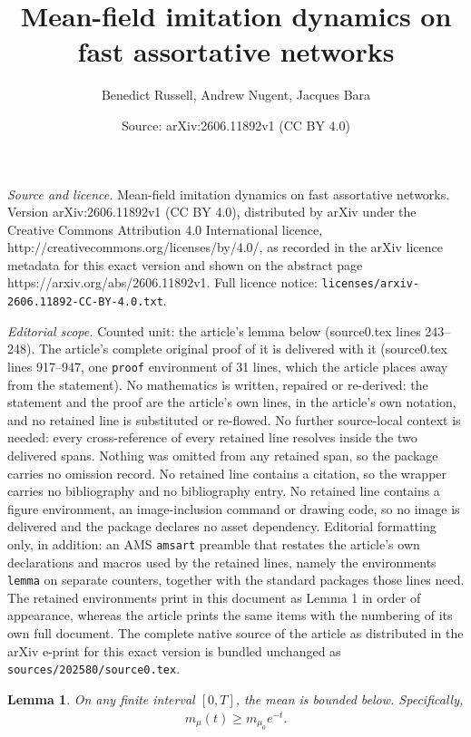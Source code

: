 \documentclass[10pt,a4paper]{amsart}
\title{Mean-field imitation dynamics on fast assortative networks}
\author{Benedict Russell, Andrew Nugent, Jacques Bara}
\date{Source: arXiv:2606.11892v1 (CC BY 4.0)}
\newtheorem{lemma}{Lemma}
\begin{document}
\maketitle

\noindent\emph{Source and licence.} Mean-field imitation dynamics on fast assortative networks. Version arXiv:2606.11892v1 (CC BY 4.0), distributed by arXiv under the Creative Commons Attribution 4.0 International licence, http://creativecommons.org/licenses/by/4.0/, as recorded in the arXiv licence metadata for this exact version and shown on the abstract page https://arxiv.org/abs/2606.11892v1. Full licence notice: \texttt{licenses/arxiv-2606.11892-CC-BY-4.0.txt}.\par\smallskip

\noindent\textit{Editorial scope.} Counted unit: the article's lemma below (source0.tex lines 243--248). The article's complete original proof of it is delivered with it (source0.tex lines 917--947, one \texttt{proof} environment of 31 lines, which the article places away from the statement). No mathematics is written, repaired or re-derived: the statement and the proof are the article's own lines, in the article's own notation, and no retained line is substituted or re-flowed.  No further source-local context is needed: every cross-reference of every retained line resolves inside the two delivered spans.  Nothing was omitted from any retained span, so the package carries no omission record.  No retained line contains a citation, so the wrapper carries no bibliography and no bibliography entry.  No retained line contains a figure environment, an image-inclusion command or drawing code, so no image is delivered and the package declares no asset dependency.  Editorial formatting only, in addition: an AMS \texttt{amsart} preamble that restates the article's own declarations and macros used by the retained lines, namely the environments \texttt{lemma} on separate counters, together with the standard packages those lines need.  The retained environments print in this document as Lemma 1 in order of appearance, whereas the article prints the same items with the numbering of its own full document.  The complete native source of the article as distributed in the arXiv e-print for this exact version is bundled unchanged as \texttt{sources/202580/source0.tex}.
\begin{lemma}\label{lem: mean bounded below}
    On any finite interval $[0,T]$, the mean is bounded below. Specifically,
    \begin{align*}
        m_\mu(t) \geq m_{\mu_0}e^{-{t}}.
    \end{align*}
\end{lemma}
\end{document}
